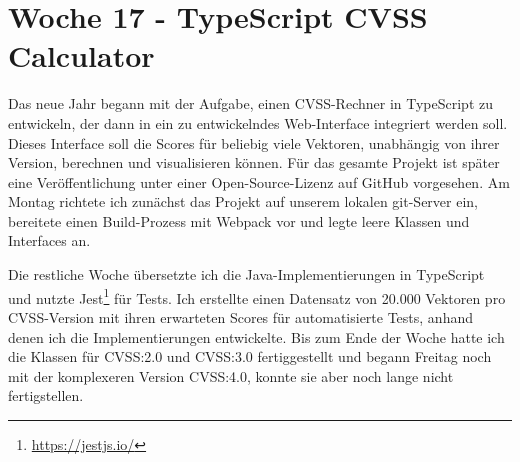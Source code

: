 \section{Woche 17 - TypeScript CVSS Calculator} \label{sec:bericht-wo-17}


\lweekdaymarginpar{\weekdayMondayLong}

Das neue Jahr begann mit der Aufgabe, einen CVSS-Rechner in TypeScript zu entwickeln, der dann in ein zu entwickelndes Web-Interface integriert werden soll.
Dieses Interface soll die Scores für beliebig viele Vektoren, unabhängig von ihrer Version, berechnen und visualisieren können.
Für das gesamte Projekt ist später eine Veröffentlichung unter einer Open-Source-Lizenz auf GitHub vorgesehen.
Am Montag richtete ich zunächst das Projekt auf unserem lokalen git-Server ein, bereitete einen Build-Prozess mit Webpack vor und legte leere Klassen und Interfaces an.

\sweekdaymarginpar{\weekdayTuesdayShort\ - \weekdayFridayShort}

Die restliche Woche übersetzte ich die Java-Implementierungen in TypeScript und nutzte Jest\footnote{\url{https://jestjs.io/}} für Tests.
Ich erstellte einen Datensatz von 20.000 Vektoren pro CVSS-Version mit ihren erwarteten Scores für automatisierte Tests, anhand denen ich die Implementierungen entwickelte.
Bis zum Ende der Woche hatte ich die Klassen für CVSS:2.0 und CVSS:3.0 fertiggestellt und begann Freitag noch mit der komplexeren Version CVSS:4.0, konnte sie aber noch lange nicht fertigstellen.
